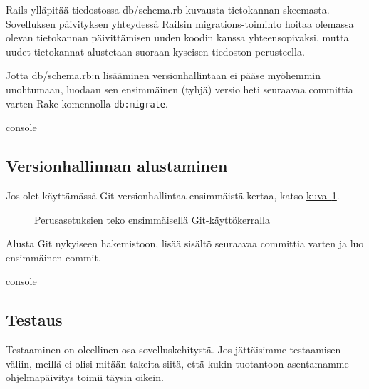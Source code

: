 \documentclass{article}
\newenvironment{myfigure}{
  \begin{figure}
    \centering
    \begin{lrbox}{\myfigurebox}
      \begin{minipage}{0.8\textwidth}
}{
      \end{minipage}
    \end{lrbox}
    \fcolorbox{blue}{blue!1}{\usebox{\myfigurebox}}
  \end{figure}
}
\newcommand{\myref}[2]{\hyperref[#2]{#1~\ref*{#2}}}
\begin{document}
Rails ylläpitää tiedostossa db/schema.rb kuvausta tietokannan skeemasta.
Sovelluksen päivityksen yhteydessä Railsin migrations-toiminto hoitaa olemassa
olevan tietokannan päivittämisen uuden koodin kanssa yhteensopivaksi, mutta
uudet tietokannat alustetaan suoraan kyseisen tiedoston perusteella.

\begin{samepage}
Jotta db/schema.rb:n lisääminen versionhallintaan ei pääse myöhemmin
unohtumaan, luodaan sen ensimmäinen (tyhjä) versio heti seuraavaa committia
varten Rake-komennolla \texttt{db:migrate}.

\begin{pygmented}{console}
\end{pygmented}
\end{samepage}

\subsection{Versionhallinnan alustaminen}

Jos olet käyttämässä Git-versionhallintaa ensimmäistä kertaa, katso
\myref{kuva}{fig:git-initial-config}.

\begin{myfigure}
\caption{Perusasetuksien teko ensimmäisellä Git-käyttökerralla}
\label{fig:git-initial-config}
\end{myfigure}

\begin{samepage}
Alusta Git nykyiseen hakemistoon, lisää sisältö seuraavaa committia varten ja
luo ensimmäinen commit.

\begin{pygmented}{console}
\end{pygmented}
\end{samepage}

\subsection{Testaus}

Testaaminen on oleellinen osa sovelluskehitystä. Jos jättäisimme testaamisen
väliin, meillä ei olisi mitään takeita siitä, että kukin tuotantoon asentamamme
ohjelmapäivitys toimii täysin oikein.
\end{document}
